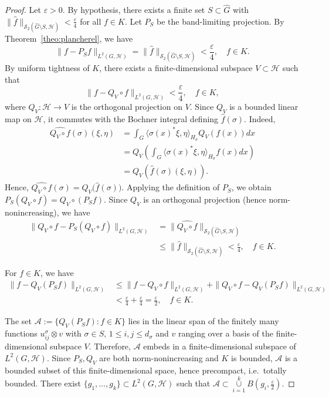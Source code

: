 \documentclass[11pt]{amsart}
\def\union{\mathop{\cup }}
\begin{document}
\begin{proof}
Let $\varepsilon>0$.
 By hypothesis, there exists a  finite set 
$S\subset\widehat{G}$ with $\|\widehat f\|_{\mathscr{S}_2(\widehat{G}\setminus S,\mathcal{H})}<\frac{\varepsilon}{4}$ for
all $f\in K$. Let $P_S$ be the band-limiting projection. By Theorem~\ref{theo:plancherel}, we have 
$$
\|f-P_Sf\|_{L^2(G,\mathcal{H})}=\|\widehat f\|_{\mathscr{S}_2(\widehat{G}\setminus S,\mathcal{H})}<
\frac{\varepsilon}{4},\quad f\in K.
$$
By uniform tightness of
$K$, there exists a finite-dimensional subspace $V\subset\mathcal{H}$ such that
$$
\|f-Q_V\!\circ f\|_{L^2(G,\mathcal{H})}<\frac{\varepsilon}{4},\quad f\in K,
$$
where $Q_V:\mathcal{H}\to V$ is the orthogonal projection on $V$. Since $Q_V$ is a bounded linear map on
$\mathcal{H}$, it commutes with the Bochner integral defining $\widehat f(\sigma)$. Indeed,
\begin{align*}
\widehat{Q_V\circ f}(\sigma)(\xi,\eta)&=\int_G\langle \sigma(x)^* \xi,\eta\rangle_{H_\sigma}Q_V(f(x))dx\\
&=Q_V\left(\int_G\langle \sigma(x)^* \xi,\eta\rangle_{H_\sigma}f(x)dx\right)\\
&=Q_V(\widehat f(\sigma)(\xi,\eta)).
\end{align*}
Hence, $\widehat{Q_V\circ f}(\sigma)=Q_V\big(\widehat f(\sigma)\big)$. Applying the definition of $P_S$, we obtain
$P_S(Q_V\!\circ f)=Q_V\!\circ(P_Sf)$. Since $Q_V$ is an orthogonal projection
(hence norm-nonincreasing), we have 
\begin{align*}
\|Q_V\!\circ f-P_S(Q_V\!\circ f)\|_{L^2(G,\mathcal{H})}&=\|\widehat{Q_V\circ f}\|_{\mathscr{S}_2(\widehat{G}\setminus
S,\mathcal{H})}\\
&\le\|\widehat f\|_{\mathscr{S}_2(\widehat{G}\setminus S,\mathcal{H})}<\frac{\varepsilon}{4},\quad f\in K.
\end{align*}

For $f\in K$, we have 
\begin{align*}
\|f-Q_V(P_Sf)\|_{L^2(G,\mathcal{H})}&\le\|f-Q_V\!\circ f\|_{L^2(G,\mathcal{H})}+\|Q_V\!\circ f-Q_V(P_Sf)\|_{L^2(G,\mathcal{H})}\\
&<\frac{\varepsilon}{4}+\frac{\varepsilon}{4}=\frac{\varepsilon}{2},\quad f\in K.
\end{align*}

\noindent The set $\mathcal{A}:=\{Q_V(P_Sf):f\in K\}$ lies in the linear span of the
finitely many functions $u^\sigma_{ij}\otimes v$ with $\sigma\in S, \, 1\leq i,j\leq d_\sigma$ and $v$ ranging over a basis of the finite-dimensional subspace $V$. Therefore,  $\mathcal{A}$ embeds in a finite-dimensional subspace of $L^2(G,\mathcal{H})$. Since $P_S,Q_V$ are both norm-nonincreasing and $K$ is bounded,
$\mathcal{A}$ is a bounded subset of this finite-dimensional space, hence precompact,  i.e.\  totally bounded. There exist $\{g_1,\dots,g_k\}\subset L^2(G,\mathcal{H})$ such that $\mathcal{A}\subset \union\limits_{i=1}^kB(g_i,\frac{\varepsilon}{2})$. 


\end{proof}
\end{document}
